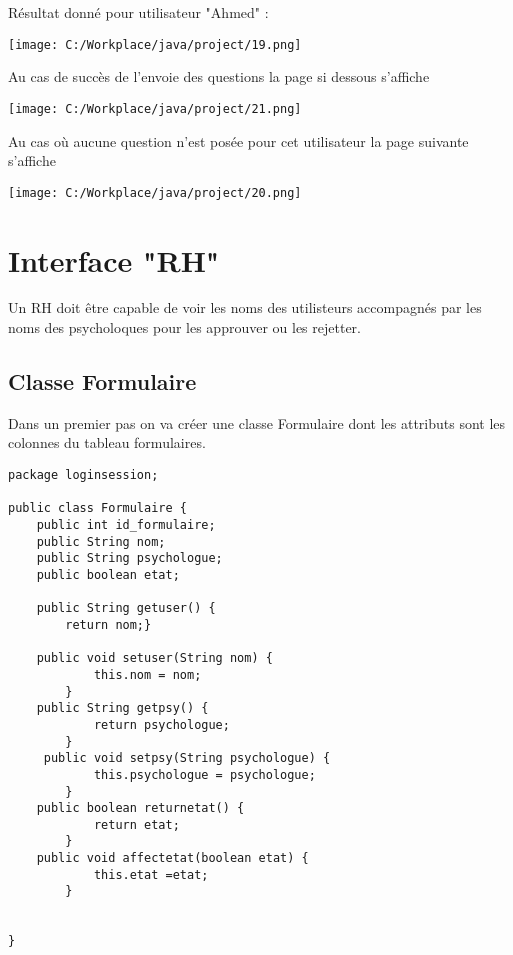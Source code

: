 \documentclass[12]{article}
\begin{document}
Résultat donné pour utilisateur "Ahmed" :\\

\begin{center}
\texttt{[image: C:/Workplace/java/project/19.png]}
\end{center}


Au cas de succès de l'envoie des questions la page si dessous s'affiche

\begin{center}
\texttt{[image: C:/Workplace/java/project/21.png]}
\end{center}


Au cas où aucune question n'est posée pour cet utilisateur la page suivante s'affiche

\begin{center}
\texttt{[image: C:/Workplace/java/project/20.png]}
\end{center}




\section{Interface "RH"}

Un RH doit être capable de voir les noms des utilisteurs accompagnés par les noms des psycholoques
pour les approuver ou les rejetter. 
\subsection{Classe Formulaire}

Dans un premier pas on va créer une classe Formulaire dont les attributs sont les colonnes du tableau formulaires.

\lstset{language=java}
\begin{lstlisting}
package loginsession;

public class Formulaire {
	public int id_formulaire;
	public String nom;
	public String psychologue;
	public boolean etat;
	
	public String getuser() {
		return nom;}
		
	public void setuser(String nom) {
	        this.nom = nom;
	    }
	public String getpsy() {
	        return psychologue;
	    }
	 public void setpsy(String psychologue) {
	        this.psychologue = psychologue;
	    }
    public boolean returnetat() {
			return etat;
		}
    public void affectetat(boolean etat) {
			this.etat =etat;
		}
		

}
\end{lstlisting}
\end{document}
